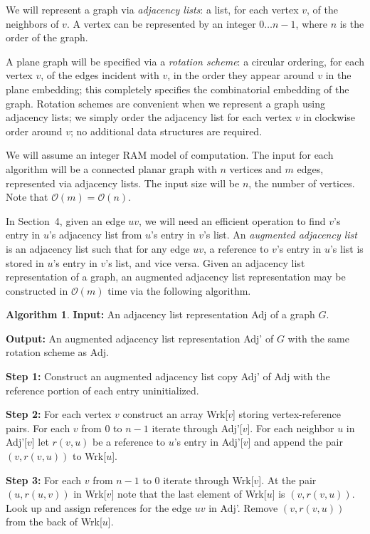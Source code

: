 \documentclass[12pt,letterpaper]{article}
\theoremstyle{plain}
\theoremstyle{definition}
\theoremstyle{break}
\newtheorem{algorithm}[lemma]{Algorithm}     %
\newcommand{\defterm}[1]{\emph{#1}} %
\begin{document}
We will represent a graph via \textit{adjacency lists}:
a list, for each vertex $v$, of the neighbors of $v$.
A vertex can be represented by an integer $0\dots n-1$,
where $n$ is the order of the graph.

A plane graph will be specified via
a \defterm{rotation scheme}:
a circular ordering,
for each vertex $v$, of the edges incident with $v$,
in the order they appear around $v$ in the plane embedding;
this completely specifies
the combinatorial embedding of the graph.
Rotation schemes are convenient when we represent a graph
using adjacency lists;
we simply order the adjacency
list for each vertex $v$ in clockwise order around $v$;
no additional data structures are required.

We will assume an integer RAM model of computation. The input for each algorithm
will be a connected planar graph with $n$ vertices and $m$ edges, represented
via adjacency lists. The input size will be $n$, the number of vertices. Note
that $\mathcal{O}(m)=\mathcal{O}(n)$.

In Section~4, given an edge $uv$, we will need an efficient operation to
find $v$'s entry in $u$'s adjacency list from $u$'s entry in $v$'s list.
An \defterm{augmented adjacency list} is an adjacency list such that for
any edge $uv$, a reference to $v$'s entry in
$u$'s list is stored in $u$'s entry in $v$'s list, and vice versa. Given an
adjacency list representation of a graph, an augmented
adjacency list representation may be constructed in $\mathcal{O}(m)$ time via
the following algorithm.

\begin{algorithm} \label{A:augment}
\textbf{Input:} An adjacency list representation Adj of a graph $G$.

\textbf{Output:} An augmented adjacency list representation Adj' of $G$ with
the same rotation scheme as Adj.

\textbf{Step 1:} Construct an augmented adjacency list copy Adj' of Adj with
the reference portion of each entry uninitialized.

\textbf{Step 2:} For each vertex $v$ construct an array Wrk[$v$] storing
vertex-reference pairs. For each $v$ from $0$ to $n-1$ iterate through
Adj'[$v$]. For each neighbor $u$ in Adj'[$v$] let
$r(v,u)$ be a reference to $u$'s entry in Adj'[$v$] and append the pair
$(v,r(v,u))$ to Wrk[$u$].

\textbf{Step 3:} For each $v$ from $n-1$ to $0$ iterate through Wrk[$v$]. At
the pair $(u,r(u,v))$ in Wrk[$v$] note that the last element of Wrk[$u$] is
$(v,r(v,u))$. Look up and assign references for the edge $uv$ in Adj'. Remove
$(v,r(v,u))$ from the back of Wrk[$u$].
\end{algorithm}
\end{document}
